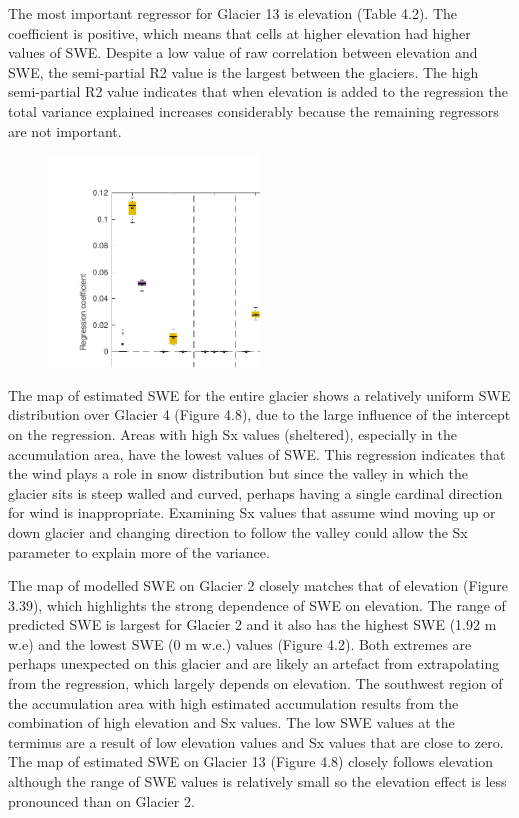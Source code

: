 \documentclass[twocolumn,letterpaper]{igs}
\begin{document}
The most important regressor for Glacier 13 is elevation (Table 4.2). The coefficient is positive, which means that cells at higher elevation had higher values of SWE. Despite a low value of raw correlation between elevation and SWE, the semi-partial R2 value is the largest between the glaciers. The high semi-partial R2 value indicates that when elevation is added to the regression the total variance explained increases considerably because the remaining regressors are not important. 


\begin{figure}
	\centering
	\includegraphics[width =0.5\textwidth]{BetaCoeffs.pdf}\\
	\caption{}
	\label{fig:BetaCoeffs}
\end{figure}



The map of estimated SWE for the entire glacier shows a relatively uniform SWE distribution over Glacier 4 (Figure 4.8), due to the large influence of the intercept on the regression. Areas with high Sx values (sheltered), especially in the accumulation area, have the lowest values of SWE. This regression indicates that the wind plays a role in snow distribution but since the valley in which the glacier sits is steep walled and curved, perhaps having a single cardinal direction for wind is inappropriate. Examining Sx values that assume wind moving up or down glacier and changing direction to follow the valley could allow the Sx parameter to explain more of the variance.

The map of modelled SWE on Glacier 2 closely matches that of elevation (Figure 3.39), which highlights the strong dependence of SWE on elevation. The range of predicted SWE is largest for Glacier 2 and it also has the highest SWE (1.92 m w.e) and the lowest SWE (0 m w.e.) values (Figure 4.2). Both extremes are perhaps unexpected on this glacier and are likely an artefact from extrapolating from the regression, which largely depends on elevation. The southwest region of the accumulation area with high estimated accumulation results from the combination of high elevation and Sx values. The low SWE values at the terminus are a result of low elevation values and Sx values that are close to zero. The map of estimated SWE on Glacier 13 (Figure 4.8) closely follows elevation although the range of SWE values is relatively small so the elevation effect is less pronounced than on Glacier 2.
\end{document}
